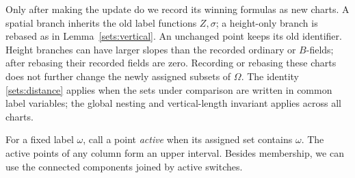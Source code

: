 Only after making the update do we record its winning formulas as new
charts. A spatial branch inherits the old label functions $Z,\sigma$;
a height-only branch is rebased as in Lemma~\ref{sets:vertical}. An
unchanged point keeps its old identifier. Height branches can have larger
slopes than the recorded ordinary or $B$-fields; after rebasing their
recorded fields are zero. Recording or rebasing these charts does not further change the newly
assigned subsets of $\Omega$. The identity \eqref{sets:distance} applies when the sets under
comparison are written in common label variables; the global nesting
and vertical-length invariant applies across all charts.

For a fixed label $\omega$, call a point \emph{active} when its assigned
set contains $\omega$. The active points of any column form an upper
interval. Besides membership, we can use the connected components joined
by active switches.

